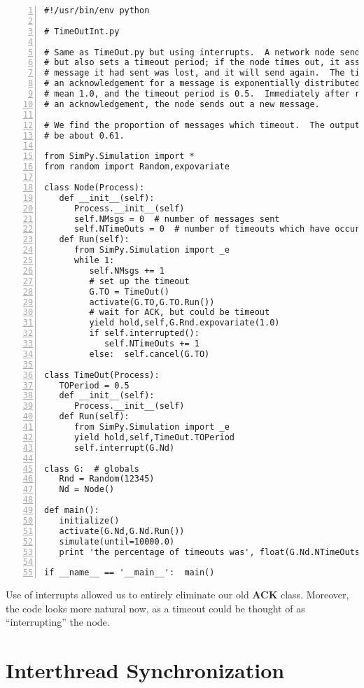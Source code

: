 \documentclass[11pt]{article}
\begin{document}
\begin{Verbatim}[fontsize=\relsize{-2},numbers=left]
#!/usr/bin/env python

# TimeOutInt.py

# Same as TimeOut.py but using interrupts.  A network node sends a message
# but also sets a timeout period; if the node times out, it assumes the
# message it had sent was lost, and it will send again.  The time to get
# an acknowledgement for a message is exponentially distributed with
# mean 1.0, and the timeout period is 0.5.  Immediately after receiving
# an acknowledgement, the node sends out a new message.

# We find the proportion of messages which timeout.  The output should
# be about 0.61.

from SimPy.Simulation import *
from random import Random,expovariate

class Node(Process):
   def __init__(self):
      Process.__init__(self)  
      self.NMsgs = 0  # number of messages sent
      self.NTimeOuts = 0  # number of timeouts which have occurred
   def Run(self):
      from SimPy.Simulation import _e
      while 1:
         self.NMsgs += 1
         # set up the timeout
         G.TO = TimeOut()
         activate(G.TO,G.TO.Run())
         # wait for ACK, but could be timeout
         yield hold,self,G.Rnd.expovariate(1.0)
         if self.interrupted():
            self.NTimeOuts += 1
         else:  self.cancel(G.TO)

class TimeOut(Process):
   TOPeriod = 0.5
   def __init__(self):
      Process.__init__(self)  
   def Run(self):
      from SimPy.Simulation import _e
      yield hold,self,TimeOut.TOPeriod
      self.interrupt(G.Nd)

class G:  # globals
   Rnd = Random(12345)
   Nd = Node()

def main():
   initialize()  
   activate(G.Nd,G.Nd.Run())
   simulate(until=10000.0)
   print 'the percentage of timeouts was', float(G.Nd.NTimeOuts)/G.Nd.NMsgs

if __name__ == '__main__':  main()
\end{Verbatim}

Use of interrupts allowed us to entirely eliminate our old {\bf ACK}
class.  Moreover, the code looks more natural now, as a timeout could be
thought of as ``interrupting'' the node.

\section{Interthread Synchronization}
\end{document}
